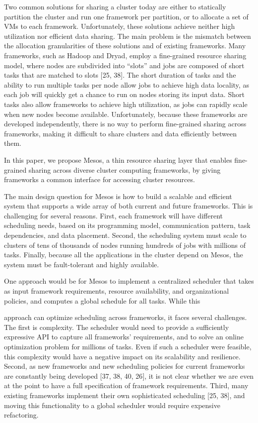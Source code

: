 \documentclass[
]{article}
\begin{document}
Two common solutions for sharing a cluster today are either to
statically partition the cluster and run one framework per partition, or
to allocate a set of VMs to each framework. Unfortunately, these
solutions achieve neither high utilization nor efficient data sharing.
The main problem is the mismatch between the allocation granularities of
these solutions and of existing frameworks. Many frameworks, such as
Hadoop and Dryad, employ a fine-grained resource sharing model, where
nodes are subdivided into ``slots'' and jobs are composed of short tasks
that are matched to slots {[}25, 38{]}. The short duration of tasks and
the ability to run multiple tasks per node allow jobs to achieve high
data locality, as each job will quickly get a chance to run on nodes
storing its input data. Short tasks also allow frameworks to achieve
high utilization, as jobs can rapidly scale when new nodes become
available. Unfortunately, because these frameworks are developed
independently, there is no way to perform fine-grained sharing across
frameworks, making it difficult to share clusters and data efficiently
between them.

In this paper, we propose Mesos, a thin resource sharing layer that
enables fine-grained sharing across diverse cluster computing
frameworks, by giving frameworks a common interface for accessing
cluster resources.

The main design question for Mesos is how to build a scalable and
efficient system that supports a wide array of both current and future
frameworks. This is challenging for several reasons. First, each
framework will have different scheduling needs, based on its programming
model, communication pattern, task dependencies, and data placement.
Second, the scheduling system must scale to clusters of tens of
thousands of nodes running hundreds of jobs with millions of tasks.
Finally, because all the applications in the cluster depend on Mesos,
the system must be fault-tolerant and highly available.

One approach would be for Mesos to implement a centralized scheduler
that takes as input framework requirements, resource availability, and
organizational policies, and computes a global schedule for all tasks.
While this

approach can optimize scheduling across frameworks, it faces several
challenges. The first is complexity. The scheduler would need to provide
a sufficiently expressive API to capture all frameworks' requirements,
and to solve an online optimization problem for millions of tasks. Even
if such a scheduler were feasible, this complexity would have a negative
impact on its scalability and resilience. Second, as new frameworks and
new scheduling policies for current frameworks are constantly being
developed {[}37, 38, 40, 26{]}, it is not clear whether we are even at
the point to have a full specification of framework requirements. Third,
many existing frameworks implement their own sophisticated scheduling
{[}25, 38{]}, and moving this functionality to a global scheduler would
require expensive refactoring.
\end{document}
